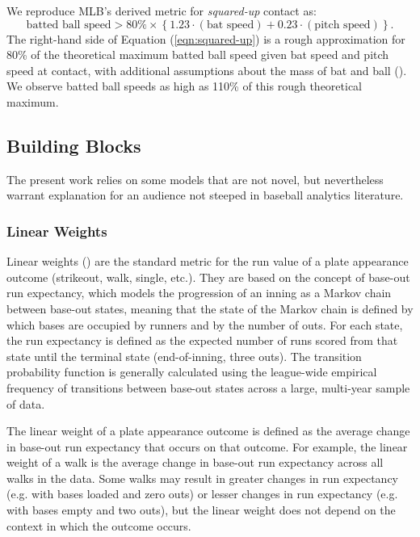\documentclass{article}
\begin{document}
    We reproduce MLB's derived metric for {\it squared-up} contact as:
    \begin{equation}
        \label{eqn:squared-up}
    \mbox{batted ball speed} > 80\% \times \left\{1.23 \cdot (\mbox{bat speed}) + 0.23 \cdot (\mbox{pitch speed})\right\}.
    \end{equation}
    The right-hand side of Equation (\ref{eqn:squared-up}) is a rough approximation for 80\% of the theoretical maximum batted ball speed given bat speed and pitch speed at contact, with additional assumptions about the mass of bat and ball (\cite{nathan_dynamics_2000}). We observe batted ball speeds as high as 110\% of this rough theoretical maximum.

    \subsection{Building Blocks}

      The present work relies on some models that are not novel, but nevertheless warrant explanation for an audience not steeped in baseball analytics literature.
    
      \subsubsection{Linear Weights}
      \label{sec:linear-weights}

        Linear weights (\cite{thorn_hidden_1984}) are the standard metric for the run value of a plate appearance outcome (strikeout, walk, single, etc.). They are based on the concept of base-out run expectancy, which models the progression of an inning as a Markov chain between base-out states, meaning that the state of the Markov chain is defined by which bases are occupied by runners and by the number of outs. For each state, the run expectancy is defined as the expected number of runs scored from that state until the terminal state (end-of-inning, three outs). The transition probability function is generally calculated using the league-wide empirical frequency of transitions between base-out states across a large, multi-year sample of data.

        The linear weight of a plate appearance outcome is defined as the average change in base-out run expectancy that occurs on that outcome. For example, the linear weight of a walk is the average change in base-out run expectancy across all walks in the data. Some walks may result in greater changes in run expectancy (e.g. with bases loaded and zero outs) or lesser changes in run expectancy (e.g. with bases empty and two outs), but the linear weight does not depend on the context in which the outcome occurs.
\end{document}
